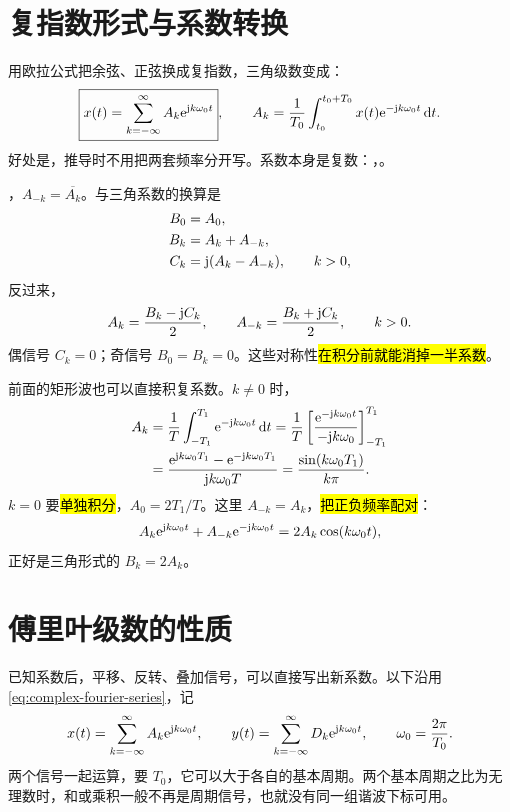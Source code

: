 \section{复指数形式与系数转换}
\label{sec:complex-fourier-series}

用欧拉公式把余弦、正弦换成复指数，三角级数变成：
\begin{equation}
  \boxed{
    x(t)=\sum_{k=-\infty}^{\infty}A_k\mathrm{e}^{\mathrm{j} k\omega_0t}
  },
  \qquad
  A_k=\frac{1}{T_0}\int_{t_0}^{t_0+T_0}
  x(t)\mathrm{e}^{-\mathrm{j} k\omega_0t}\mathop{}\!\mathrm{d} t.
  \label{eq:complex-fourier-series}
\end{equation}
好处是，推导时不用把两套频率分开写。系数本身是复数：，。

，$A_{-k}=\overline{A_k}$。与三角系数的换算是
\begin{align}
  B_0&=A_0,\\
  B_k&=A_k+A_{-k},\\
  C_k&=\mathrm{j}(A_k-A_{-k}),\qquad k>0,
  \label{eq:fourier-coefficient-conversion-forward}
\end{align}
反过来，
\begin{equation}
  A_k=\frac{B_k-\mathrm{j} C_k}{2},
  \qquad
  A_{-k}=\frac{B_k+\mathrm{j} C_k}{2},
  \qquad k>0.
  \label{eq:fourier-coefficient-conversion-inverse}
\end{equation}
偶信号 $C_k=0$；奇信号 $B_0=B_k=0$。这些对称性\hl{在积分前就能消掉一半系数}。

前面的矩形波也可以直接积复系数。$k\ne0$ 时，
\begin{align*}
  A_k&=\frac1T\int_{-T_1}^{T_1}\mathrm{e}^{-\mathrm{j} k\omega_0t}\mathop{}\!\mathrm{d} t
      =\frac1T\left[\frac{\mathrm{e}^{-\mathrm{j} k\omega_0t}}{-\mathrm{j} k\omega_0}\right]_{-T_1}^{T_1}\\
     &=\frac{\mathrm{e}^{\mathrm{j} k\omega_0T_1}-\mathrm{e}^{-\mathrm{j} k\omega_0T_1}}
             {\mathrm{j} k\omega_0T}
      =\frac{\sin(k\omega_0T_1)}{k\pi}.
\end{align*}
$k=0$ 要\hl{单独积分}，$A_0=2T_1/T$。这里 $A_{-k}=A_k$，\hl{把正负频率配对}：
\[
  A_k\mathrm{e}^{\mathrm{j} k\omega_0t}+A_{-k}\mathrm{e}^{-\mathrm{j} k\omega_0t}
  =2A_k\cos(k\omega_0t),
\]
正好是三角形式的 $B_k=2A_k$。

\begingroup
\raggedbottom

\section{傅里叶级数的性质}
\label{sec:fourier-series-properties}

已知系数后，平移、反转、叠加信号，可以直接写出新系数。以下沿用\cref{eq:complex-fourier-series}，记
\[
  x(t)=\sum_{k=-\infty}^{\infty}A_k\mathrm{e}^{\mathrm{j} k\omega_0t},
  \qquad
  y(t)=\sum_{k=-\infty}^{\infty}D_k\mathrm{e}^{\mathrm{j} k\omega_0t},
  \qquad \omega_0=\frac{2\pi}{T_0}.
\]
两个信号一起运算，要 $T_0$，它可以大于各自的基本周期。两个基本周期之比为无理数时，和或乘积一般不再是周期信号，也就没有同一组谐波下标可用。

